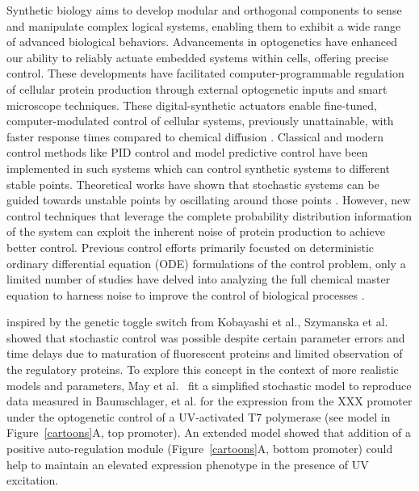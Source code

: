 \documentclass[12pt]{article}
\begin{document}
Synthetic biology aims to develop modular\cite{Ng2019} and orthogonal \cite{Liu2018} components to sense and manipulate \cite{Sheets2020} complex logical systems, enabling them to exhibit a wide range of advanced biological behaviors\cite{Shin2020}. Advancements in optogenetics have enhanced our ability to reliably actuate embedded systems within cells, offering precise control\cite{Sheets2020,Baumschlager2017,Chen2020,Lillacci2018}. These developments have facilitated computer-programmable regulation of cellular protein production through external optogenetic inputs and smart microscope techniques\cite{Fox2021,Baumschlager2021,Lugagne2017}. These digital-synthetic actuators enable fine-tuned, computer-modulated control of cellular systems, previously unattainable, with faster response times compared to chemical diffusion\cite{Rullan2018, Baumschlager2017} . Classical and modern control methods like PID control and model predictive control have been implemented in such systems\cite{} which can control synthetic systems to different stable points. 
Theoretical works have shown that stochastic systems can be guided towards unstable points by oscillating around those points \cite{Guarino2020}. However, new control techniques that leverage the complete probability distribution information of the system can exploit the inherent noise of protein production to achieve better control. Previous control efforts primarily focusted on deterministic ordinary differential equation (ODE) formulations of the control problem, only a limited number of studies have delved into analyzing the full chemical master equation to harness noise to improve the control of biological processes \cite{Szymanska2015,May2021}.

inspired by the genetic toggle switch from Kobayashi et al.\cite{Kobayashi:2004}, Szymanska et al.~\cite{Szymanska2015} showed that stochastic control was possible despite certain parameter errors and time delays due to maturation of fluorescent proteins and limited observation of the regulatory proteins. 
To explore this concept in the context of more realistic models and parameters, May et al.~\cite{May2021} fit a simplified stochastic model to reproduce data measured in Baumschlager, et al.\cite{} for the expression from the XXX promoter under the optogenetic control of a UV-activated T7 polymerase (see model in Figure\ \ref{cartoons}A, top promoter).  An extended model showed that addition of a positive auto-regulation module (Figure\ \ref{cartoons}A, bottom promoter) could help to maintain an elevated expression phenotype in the presence of UV excitation.
\end{document}
